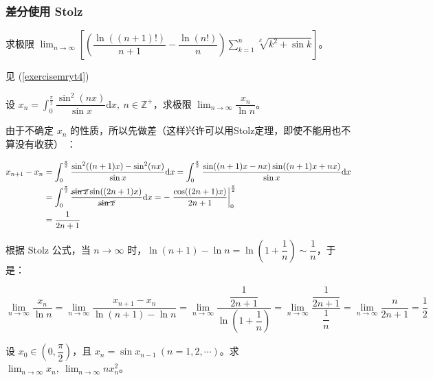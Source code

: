 \subsubsection{差分使用 Stolz}

\begin{exercise}

求极限 $\displaystyle \lim_{n \to \infty} \left[ \left( \dfrac{\ln((n+1)!)}{n+1} - \dfrac{\ln(n!)}{n} \right) \sum_{k=1}^n \sqrt[k]{k^2 + \sin k} \right]$。

\end{exercise}

见 (\ref{exercisemryt4})

\begin{exercise}

设 $\displaystyle x_n = \int_{0}^{\frac{\pi}{2}} \dfrac{\sin^2(nx)}{\sin x} \mathrm{d}x, \ n \in \mathbb{Z}^+$，求极限 $\displaystyle \lim_{n \to \infty} \dfrac{x_n}{\ln n}$。

\end{exercise}

由于不确定 $x_n$ 的性质，所以先做差（这样兴许可以用Stolz定理，即使不能用也不算没有收获） ：

$$
\begin{aligned}\displaystyle x_{n+1} - x_n &= \int_{0}^{\frac{\pi}{2}} \dfrac{\sin^2((n+1)x) - \sin^2(nx)}{\sin x} \mathrm{d}x = \int_{0}^{\frac{\pi}{2}} \dfrac{\sin((n+1)x - nx) \sin((n+1)x + nx)}{\sin x} \mathrm{d}x \\ &= \int_{0}^{\frac{\pi}{2}} \dfrac{\cancel{\sin x} \sin((2n+1)x)}{\cancel{\sin x}} \mathrm{d}x =-\left.\dfrac{\cos((2n+1)x)}{2n+1} \right\vert_{0}^{\frac{\pi}{2}} \\ &=\dfrac{1}{2n+1}\end{aligned}
$$

根据 Stolz 公式，当 $\displaystyle n \to \infty$ 时，$\displaystyle \ln(n+1) - \ln n = \ln\left(1 + \dfrac{1}{n}\right) \sim \dfrac{1}{n}$，于是：

$$
\displaystyle \lim_{n \to \infty} \dfrac{x_n}{\ln n} =\lim_{n \to \infty} \dfrac{x_{n+1} - x_n}{\ln(n+1) - \ln n} = \lim_{n \to \infty} \dfrac{\dfrac{1}{2n+1}}{\ln\left(1 + \dfrac{1}{n}\right)} = \lim_{n \to \infty} \dfrac{\dfrac{1}{2n+1}}{\dfrac{1}{n}} = \lim_{n \to \infty} \dfrac{n}{2n+1} = \dfrac{1}{2}
$$

\begin{exercise}

设 $\displaystyle x_0 \in \left( 0, \dfrac{\pi}{2} \right)$，且 $\displaystyle x_n = \sin x_{n-1} \ (n = 1, 2, \cdots)$。求 $\displaystyle \lim_{n \to \infty} x_n, \ \lim_{n \to \infty} nx_n^2$。

\end{exercise}

